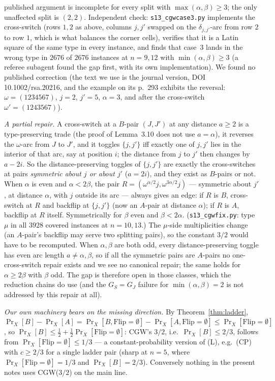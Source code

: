 \begin{remark}
published argument is incomplete for every split with
$\max(\alpha,\beta)\ge3$; the only unaffected split is $(2,2)$.
Independent check: \texttt{s13\_cgwcase3.py} implements the
cross-switch (rows $1,2$ as above, columns $j,j'$ swapped on the
$\delta_{j,j'}$-arc from row $2$ to row $1$, which is what balances
the corner cells), verifies that it is a Latin square of the same type
in every instance, and finds that case~3 lands in the wrong type in
$2676$ of $2676$ instances at $n=9,12$ with $\min(\alpha,\beta)\ge3$
(a referee subagent found the gap first, with its own implementation).
We found no published correction (the text we use is the journal
version, DOI 10.1002/rsa.20216, and the example on its p.~293 exhibits
the reversal: $\omega=(1234567)$, $j=2$, $j'=5$, $\alpha=3$, and after
the cross-switch $\omega'=(1243567)$).

\emph{A partial repair.}  A cross-switch at a $B$-pair $(J,J')$ at
any distance $a\ge2$ is a type-preserving trade (the proof of
Lemma~3.10 does not use $a=\alpha$), it reverses the $\omega$-arc from
$J$ to $J'$, and it toggles $\{j,j'\}$ iff exactly one of $j,j'$ lies in
the interior of that arc, say at position $i$; the distance from $j$
to $j'$ then changes by $a-2i$.  So the distance-preserving toggles
of $\{j,j'\}$ are exactly the cross-switches at pairs \emph{symmetric
about $j$ or about $j'$} ($a=2i$), and they exist as $B$-pairs or not.
When $\alpha$ is even and $\alpha<2\beta$, the pair
$R=(\omega^{\alpha/2}j,\omega^{3\alpha/2}j)$ --- symmetric about $j'$,
at distance $\alpha$, with $j$ outside its arc --- always gives an
edge: if $R$ is $B$, cross-switch at $R$ and backflip at $\{j,j'\}$
(now an $A$-pair at distance $\alpha$); if $R$ is $A$, backflip at
$R$ itself.  Symmetrically for $\beta$ even and $\beta<2\alpha$.
(\texttt{s13\_cgwfix.py}: type $\mu$ in all $3928$ covered instances
at $n=10,13$.)  The $\mu$-side multiplicities change (an $A$-pair's
backflip may serve two splitting pairs), so the constant $3/2$ would
have to be recomputed.  When $\alpha,\beta$ are both odd, every
distance-preserving toggle has even arc length $a\ne\alpha,\beta$, so
if all the symmetric pairs are $A$-pairs no one-cross-switch repair
exists and we see no canonical repair; the same holds for
$\alpha\ge2\beta$ with $\beta$ odd.  The gap is therefore open in
those classes, which the reduction chains do use (and the
$G_S=G_J$ failure for $\min(\alpha,\beta)=2$ is not addressed by this
repair at all).

\emph{Our own machinery bears on the missing direction.}  By
Theorem~\ref{thm:ladder}, $\Pr_X[B]-\Pr_X[A]=\Pr_X[B,\mathrm{Flip}=\emptyset]-\Pr_X[A,\mathrm{Flip}=\emptyset]\le\Pr_X[\mathrm{Flip}=\emptyset]$,
so $\Pr_X[B]\le\tfrac12+\tfrac12\Pr_X[\mathrm{Flip}=\emptyset]$: CGW's
$3/2$, i.e.\ $\Pr_X[B]\le2/3$, follows from
$\Pr_X[\mathrm{Flip}=\emptyset]\le1/3$ --- a constant-probability
version of (L), e.g.\ (CP) with $c\ge2/3$ for a single ladder pair
(sharp at $n=5$, where $\Pr_X[\mathrm{Flip}=\emptyset]=1/3$ and
$\Pr_X[B]=2/3$).
Conversely nothing in the present notes uses CGW($3/2$) on the main
line.


\end{remark}
